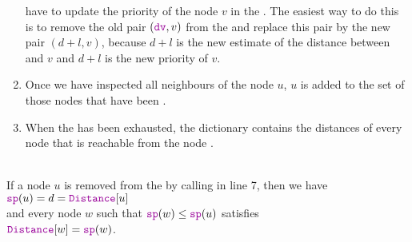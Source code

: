 \begin{enumerate}
      have to update the priority of the node $v$ in the .  The easiest way to do this is to remove
      the old pair $(\mytt{dv}, v)$ from the  and replace this pair by the new pair
      $(d+l, v)$, because $d+l$ is the new estimate of the distance between  and $v$ and
      $d+l$ is the new priority of $v$.
\item Once we have inspected all neighbours of the node $u$, $u$ is added to the set of those nodes that have
      been .
\item When the  has been exhausted, the dictionary  contains the distances of
      every node that is reachable from the node .  
\end{enumerate}

\begin{Theorem} \hspace*{\fill} \\
  If a node $u$ is removed from the  by calling  in line 7, then we have
  \\[0.2cm]
  \hspace*{1.3cm}
  $\mytt{sp}(u) = d = \mytt{Distance}[u]$
  \\[0.2cm]
  and every node $w$ such that $\mytt{sp}(w) \leq \mytt{sp}(u)$ satisfies
  \\[0.2cm]
  \hspace*{1.3cm}
  $\mytt{Distance}[w] = \mytt{sp}(w)$.
\end{Theorem}

